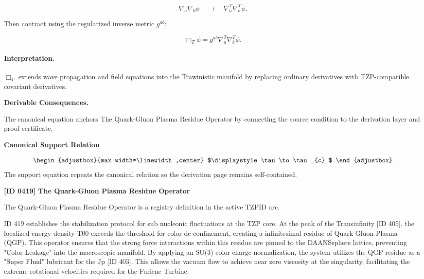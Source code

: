 \begin{equation}
\nabla_a\nabla_b\phi
\quad\longrightarrow\quad
\nabla^T_a\nabla^T_b\phi .
\end{equation}

Then contract using the regularized inverse metric $g^{ab}$:

\begin{equation}
\Box_T\phi
=
g^{ab}
\nabla^{T}_{a}
\nabla^{T}_{b}
\phi .
\end{equation}

\paragraph{Interpretation.}
$\Box_T$ extends wave propagation and field equations into the Trawinistic manifold by replacing ordinary derivatives with TZP-compatible covariant derivatives.

\par\vspace{0.35em}
\noindent\textbf{Derivable Consequences.}\quad
\begingroup
\footnotesize
\raggedright
The canonical equation anchors The Quark-Gluon Plasma Residue Operator by connecting the source condition to the derivation layer and proof certificate.
\par\endgroup

\noindent\textbf{Canonical Support Relation}\par
\[
\begin{adjustbox}{max width=\linewidth,center}
$\displaystyle
\tau\to\tau_{c}
$
\end{adjustbox}
\]
\noindent The support equation repeats the canonical relation so the derivation page remains self-contained.\par

\clearpage
\noindent\textbf{[ID 0419] The Quark-Gluon Plasma Residue Operator}\par
\vspace{0.35em}
\begingroup\small
{}
The Quark-Gluon Plasma Residue Operator is a registry definition in the active TZPID arc.

ID 419 establishes the stabilization protocol for sub nucleonic fluctuations at the TZP core. At the peak of the Transinfinity [ID 405], the localized energy density T00 exceeds the threshold for color de confinement, creating a infinitesimal residue of Quark Gluon Plasma (QGP). This operator ensures that the strong force interactions within this residue are pinned to the DAANSsphere lattice, preventing "Color Leakage" into the macroscopic manifold. By applying an SU(3) color charge normalization, the system utilizes the QGP residue as a "Super Fluid" lubricant for the Jp [ID 403]. This allows the vacuum flow to achieve near zero viscosity at the singularity, facilitating the extreme rotational velocities required for the Furiene Turbine.


